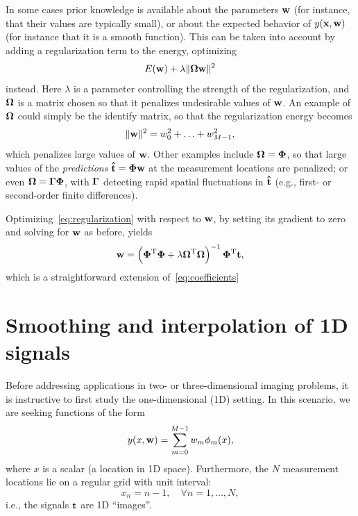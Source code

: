\documentclass[10pt,twoside]{book}
\begin{document}
In some cases prior knowledge is available about the parameters $\mathbf{w}$ (for instance, that their values are typically small), or about the expected  behavior of $y(\mathbf{x}, \mathbf{w})$ (for instance that it is a smooth function). This can be taken into account by adding a regularization term to the energy, optimizing
\begin{equation}
E(\mathbf{w}) + \lambda \| {\mbox{\boldmath {${\Omega}$}}} \mathbf{w} \|^2
\label{eq:regularization}
\end{equation}
instead. 
Here $\lambda$ is a parameter controlling the strength of the regularization, and
${\mbox{\boldmath {${\Omega}$}}}$ is a matrix chosen so that it penalizes undesirable values of $\mathbf{w}$. An example of ${\mbox{\boldmath {${\Omega}$}}}$ could simply be the identify matrix, so that the regularization energy becomes 
$$
\| \mathbf{w} \|^2 = w_0^2 + \ldots + w_{M-1}^2
,
$$
which penalizes large values of $\mathbf{w}$. Other examples include 
${\mbox{\boldmath {${\Omega}$}}} = {\mbox{\boldmath {${\Phi}$}}}$, so that large values of the \emph{predictions}
$\mathbf{\hat{t}} = {\mbox{\boldmath {${\Phi}$}}} \mathbf{w}$
at the measurement locations 
are penalized; 
or even   
${\mbox{\boldmath {${\Omega}$}}} = {\mbox{\boldmath {${\Gamma}$}}} {\mbox{\boldmath {${\Phi}$}}}$, with ${\mbox{\boldmath {${\Gamma}$}}}$ detecting rapid spatial fluctuations in 
$\mathbf{\hat{t}}$
(e.g., first- or second-order finite differences).

Optimizing~\eqref{eq:regularization} with respect to $\mathbf{w}$, by setting its gradient to zero and solving for $\mathbf{w}$ as before, yields 
\begin{equation}
\mathbf{w} =
\left( {\mbox{\boldmath {${\Phi}$}}}^\mathrm{T} {\mbox{\boldmath {${\Phi}$}}} + \lambda {\mbox{\boldmath {${\Omega}$}}}^\mathrm{T} {\mbox{\boldmath {${\Omega}$}}} \right)^{-1}
{\mbox{\boldmath {${\Phi}$}}}^\mathrm{T} \mathbf{t}
,
\label{eq:coefficientsWithRegularization}
\end{equation}
which is a straightforward extension of~\eqref{eq:coefficients}



\section{Smoothing and interpolation of 1D signals}
\label{sec:smoothingAndInterpolation1D}

Before addressing applications in two- or three-dimensional imaging problems, it is instructive to first study the one-dimensional (1D) setting. In this scenario, we are seeking functions of the form
\begin{equation}
y( x, \mathbf{w} ) = \sum_{m=0}^{M-1} w_m \phi_m( x ),
\label{eq:prediction1D}
\end{equation}
where $x$ is a scalar (a location in 1D space).
Furthermore, the 
$N$ 
measurement locations 
lie on a regular grid with unit interval:
$$
x_n = n-1, \quad \forall n=1, \ldots, N,
$$
i.e., the signals $\mathbf{t}$ are 
1D ``images''.
\end{document}
